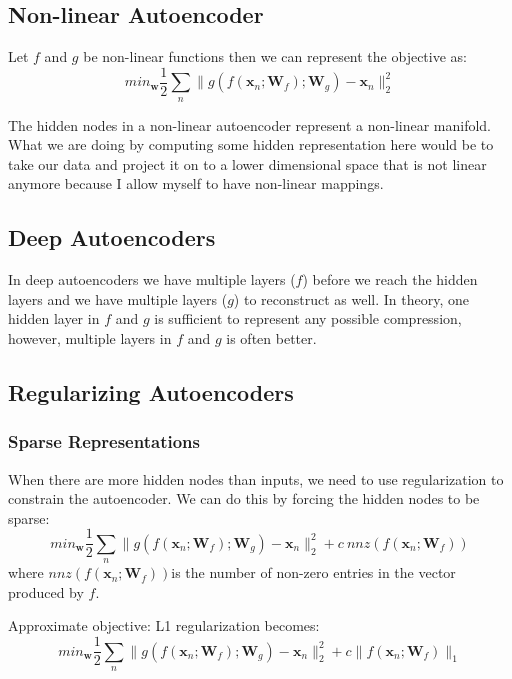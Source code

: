 \documentclass[12pt]{article}
\begin{document}
    \subsection{Non-linear Autoencoder}
        Let $f$ and $g$ be non-linear functions then we can represent the objective as:
        $$ min_{\boldsymbol{w}} \frac{1}{2} \sum_n \| g(f(\boldsymbol{x}_n; \boldsymbol{W}_f); \boldsymbol{W}_g) -
        \boldsymbol{x}_n \|^2_2$$

        The hidden nodes in a non-linear autoencoder represent a non-linear manifold. What we are doing by computing some hidden representation here would be to take our data and project it on to a
        lower dimensional space that is not linear anymore because I allow myself to have non-linear mappings. 
    
    \subsection{Deep Autoencoders}
        In deep autoencoders we have multiple layers ($f$) before we reach the hidden layers and we have multiple layers
        ($g$) to reconstruct as well. In theory, one hidden layer in $f$ and $g$ is sufficient to represent any possible
        compression, however, multiple layers in $f$ and $g$ is often better.
    
    \subsection{Regularizing Autoencoders}
        \subsubsection{Sparse Representations}
            When there are more hidden nodes than inputs, we need to use regularization to constrain the autoencoder. We
            can do this by forcing the hidden nodes to be sparse:
            $$ min_{\boldsymbol{w}} \frac{1}{2} \sum_n \| g(f(\boldsymbol{x}_n; \boldsymbol{W}_f); \boldsymbol{W}_g) -
            \boldsymbol{x}_n \|^2_2 + c \: nnz(f(\boldsymbol{x}_n; \boldsymbol{W}_f))$$
            where $nnz(f(\boldsymbol{x}_n; \boldsymbol{W}_f))$is the number of non-zero entries in the vector produced
            by $f$.
        
            Approximate objective: L1 regularization becomes:
            $$ min_{\boldsymbol{w}} \frac{1}{2} \sum_n \| g(f(\boldsymbol{x}_n; \boldsymbol{W}_f); \boldsymbol{W}_g) -
            \boldsymbol{x}_n \|^2_2 + c \| f(\boldsymbol{x}_n; \boldsymbol{W}_f) \|_1 $$
        
\end{document}
